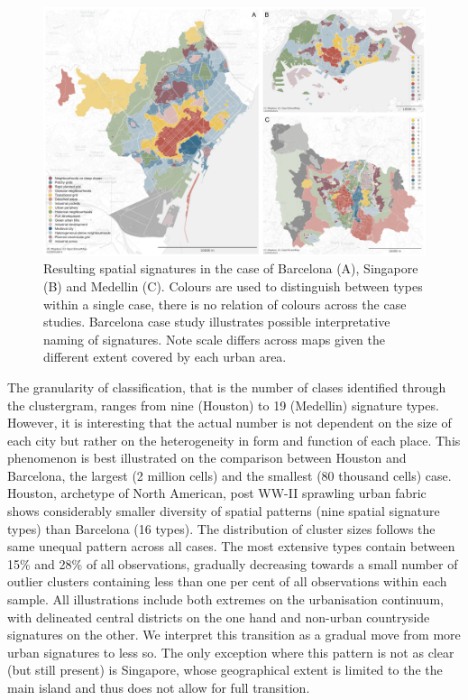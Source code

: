 \begin{figure}
    \includegraphics[width=\linewidth]{figures/maps1.png}
    \caption{Resulting spatial signatures in the case of Barcelona (A), Singapore (B)
    and Medellin (C). Colours are used to distinguish between types within a
    single case, there is no relation of colours across the case studies. Barcelona
    case study illustrates possible interpretative naming of signatures.
    Note scale differs across maps given the different extent
    covered by each urban area.}
    \label{fig:maps1}
\end{figure}

The granularity of classification, that is the number of clases identified
through the clustergram, ranges from nine (Houston) to 19 (Medellin) signature
types. However, it is interesting that the actual number is not dependent on the size of each
city but rather on the heterogeneity in form and function of each place. This
phenomenon is best illustrated on the comparison
between Houston and Barcelona, the largest (2 million cells) and the smallest (80 thousand
cells) case. Houston, archetype of North American, post WW-II sprawling urban fabric shows
considerably smaller diversity of spatial patterns (nine spatial signature
types) than
Barcelona (16 types).
The distribution of cluster sizes follows the same unequal pattern across
all cases. The most extensive types contain between 15\% and 28\% of all
observations, gradually decreasing towards a small number of
outlier clusters containing less than one per cent of all observations within each sample.
All illustrations include both extremes on the urbanisation continuum, with delineated
central districts on the one hand and non-urban countryside signatures on the
other. We interpret this
transition as a gradual move from more urban signatures to less so. The only
exception where this pattern is not as clear (but
still present) is Singapore, whose geographical extent is limited to the
the main island and thus does not allow for full transition.

